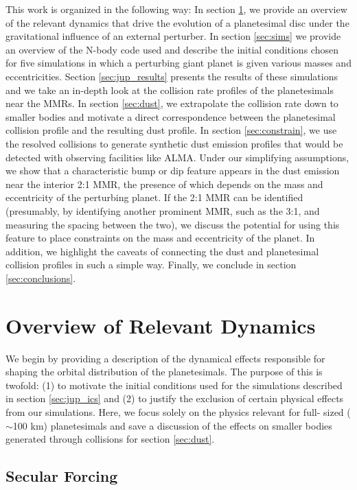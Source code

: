 This work is organized in the following way: In section \ref{sec:dynamics}, we provide an overview of the relevant dynamics that 
drive the evolution of a planetesimal disc under the gravitational influence of an external perturber. In section \ref{sec:sims} we 
provide an overview of the N-body code used and describe the initial conditions chosen for five simulations in which a perturbing 
giant planet is given various masses  and eccentricities. Section \ref{sec:jup_results} presents the results of these simulations and we 
take an in-depth look at the collision rate profiles of the planetesimals near the MMRs. In section \ref{sec:dust},  we extrapolate 
the collision rate down to smaller bodies and motivate a direct correspondence between the planetesimal collision profile and the 
resulting dust profile. In section \ref{sec:constrain}, we use the resolved collisions to generate synthetic dust emission profiles 
that would be detected with observing facilities like ALMA. Under our simplifying assumptions, we show that a characteristic 
bump or dip feature appears in the dust emission near the interior 2:1 MMR, the presence of which depends on the mass and 
eccentricity of the perturbing planet. If the 2:1 MMR can be identified (presumably, by identifying another prominent MMR, such 
as the 3:1, and measuring the spacing between the two), we discuss the potential for using this feature to place constraints on 
the mass and eccentricity of the planet. In addition, we highlight the caveats of connecting the dust and planetesimal collision 
profiles in such a simple way. Finally, we conclude in section \ref{sec:conclusions}.

\section{Overview of Relevant Dynamics} \label{sec:dynamics}

We begin by providing a description of the dynamical effects responsible for shaping the orbital distribution of the planetesimals. 
The purpose of this is twofold: (1) to motivate the initial conditions used for the simulations described in section \ref{sec:jup_ics} and 
(2) to justify the exclusion of certain physical effects from our simulations. Here, we focus solely on the physics relevant for full-
sized ($\sim$100 km) planetesimals and save a discussion of the effects on smaller bodies generated through collisions for 
section \ref{sec:dust}.

\subsection{Secular Forcing}\label{sec:sec_force}

